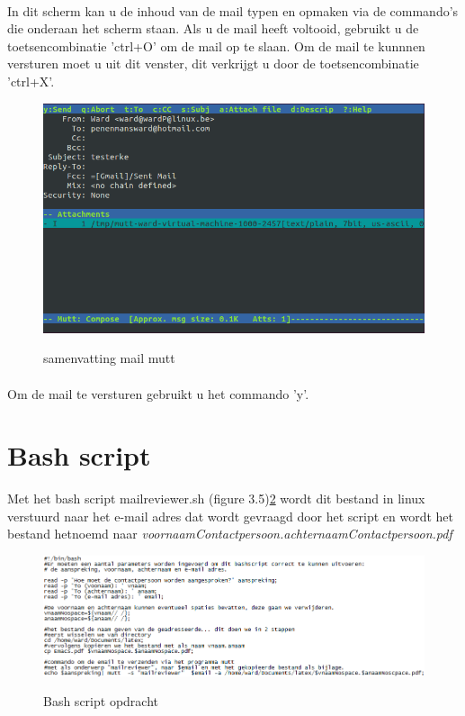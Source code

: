 \documentclass[12pt,a4paper]{report}
\begin{document}
\begin{flushleft}
\paragraph*{}
In dit scherm kan u de inhoud van de mail typen en opmaken via de commando's die onderaan het scherm staan. Als u de mail heeft voltooid, gebruikt u de toetsencombinatie 'ctrl+O' om de mail op te slaan. Om de mail te kunnnen versturen moet u uit dit venster, dit verkrijgt u door de toetsencombinatie 'ctrl+X'.
\begin{figure}[H]
\includegraphics[scale=0.75]{images/mutt_03.png}
\label{mutt_03}
\centering 
\vspace{-10pt}
\caption{samenvatting mail mutt}
\end{figure}
\paragraph*{}
Om de mail te versturen gebruikt u het commando 'y'.
\section{Bash script}
Met het bash script mailreviewer.sh (figure 3.5)\ref{bash_01} wordt dit bestand in linux verstuurd naar het e-mail adres dat wordt gevraagd door het script en wordt het bestand hetnoemd naar \textit{voornaamContactpersoon.achternaamContactpersoon.pdf}
\begin{figure}[H]
\includegraphics[scale=0.75]{images/bash_01.png}
\label{bash_01}
\centering 
\vspace{-10pt}
\caption{Bash script opdracht}
\end{figure}


\end{flushleft}
\end{document}
